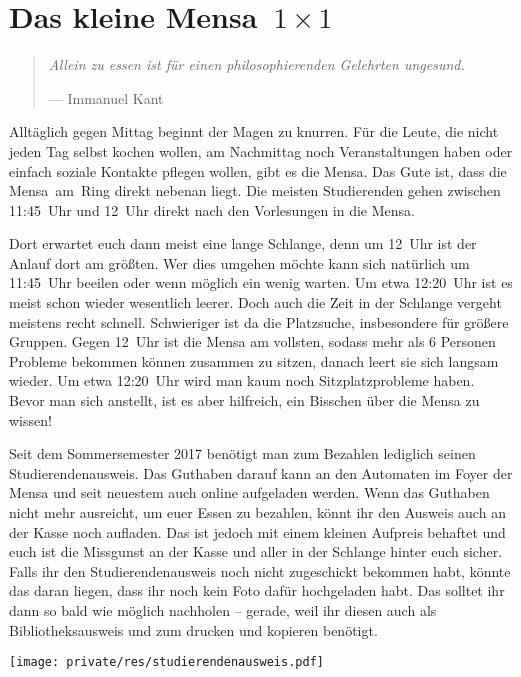 \section[Das kleine Mensa~1~×~1]{\boldmath Das kleine Mensa~${1 \times 1}$}
\begin{multicols}{2}
\begin{quote}
	\textit{Allein zu essen ist für einen philosophierenden Gelehrten ungesund.}
	
	\hfill--- Immanuel Kant
\end{quote}

Alltäglich gegen Mittag beginnt der Magen zu knurren.
Für die Leute, die nicht jeden Tag selbst kochen wollen, am Nachmittag noch Veranstaltungen haben oder einfach soziale Kontakte pflegen wollen, gibt es die Mensa.
Das Gute ist, dass die Mensa~am~Ring direkt nebenan liegt.
Die meisten Studierenden gehen zwischen 11:45~Uhr und 12~Uhr direkt nach den Vorlesungen in die Mensa.

Dort erwartet euch dann meist eine lange Schlange, denn um 12~Uhr ist der Anlauf dort am größten. Wer dies umgehen möchte kann sich natürlich um 11:45~Uhr beeilen oder wenn möglich ein wenig warten. Um etwa 12:20~Uhr ist es meist schon wieder wesentlich leerer.
Doch auch die Zeit in der Schlange vergeht meistens recht schnell. Schwieriger ist da die Platzsuche, insbesondere für größere Gruppen. Gegen 12~Uhr ist die Mensa am vollsten, sodass mehr als 6 Personen Probleme bekommen können zusammen zu sitzen, danach leert sie sich langsam wieder. Um etwa 12:20~Uhr wird man kaum noch Sitzplatzprobleme haben.
Bevor man sich anstellt, ist es aber hilfreich, ein Bisschen über die Mensa zu wissen!

Seit dem Sommersemester 2017 benötigt man zum Bezahlen lediglich seinen Studierendenausweis.
Das Guthaben darauf kann an den Automaten im Foyer der Mensa und seit neuestem auch online aufgeladen werden.
Wenn das Guthaben nicht mehr ausreicht, um euer Essen zu bezahlen, könnt ihr den Ausweis auch an der Kasse noch aufladen. 
Das ist jedoch mit einem kleinen Aufpreis behaftet und euch ist die Missgunst an der Kasse und aller in der Schlange hinter euch sicher.
Falls ihr den Studierendenausweis noch nicht zugeschickt bekommen habt, könnte das daran liegen, dass ihr noch kein Foto dafür hochgeladen habt.
Das solltet ihr dann so bald wie möglich nachholen -- gerade, weil ihr diesen auch als Bibliotheksausweis und zum drucken und kopieren benötigt.

 \begin{center}
 	\texttt{[image: private/res/studierendenausweis.pdf]}
 \end{center}


\end{multicols}
